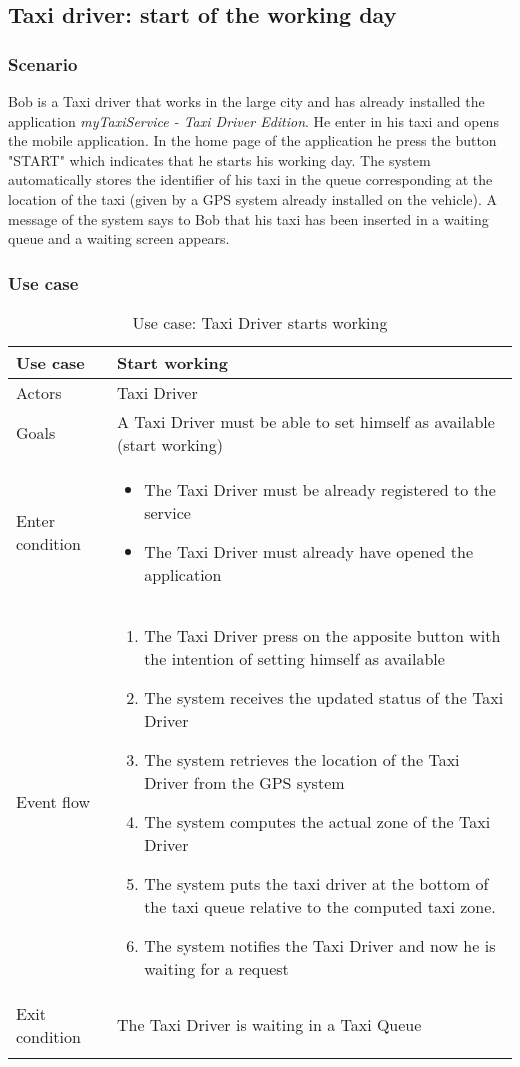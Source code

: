 \pagebreak
\subsection{Taxi driver: start of the working day}
\subsubsection{Scenario}
Bob is a Taxi driver that works in the large city and has already installed the application \textit{myTaxiService - Taxi Driver Edition}.
He enter in his taxi and opens the mobile application. In the home page of the application he press the button "START" which indicates that he starts his working day. The system automatically stores the identifier of his taxi in the queue corresponding at the location of the taxi (given by a GPS system already installed on the vehicle).
A message of the system says to Bob that his taxi has been inserted in a waiting queue and a waiting screen appears.

\subsubsection{Use case}
\begin{center}
\begin{longtable}{| p{} | p{} |} \hline
	Use case & \textbf{Start working} \\ \hline 
	Actors & Taxi Driver \\ \hline
	Goals & A Taxi Driver must be able to set himself as available (start working)  \\ \hline
	Enter condition & \begin{itemize}
						\item The Taxi Driver must be already registered to the service
						\item The Taxi Driver must already have opened the application
						\end{itemize} \\ \hline
	Event flow & \begin{enumerate}
					\item The Taxi Driver press on the apposite button with the intention of setting himself as available
					\item The system receives the updated status of the Taxi Driver
					\item The system retrieves the location of the Taxi Driver from the GPS system
					\item The system computes the actual zone of the Taxi Driver
					\item The system puts the taxi driver at the bottom of the taxi queue relative to the computed taxi zone.
					\item The system notifies the Taxi Driver and now he is waiting for a request
				\end{enumerate} \\ \hline
	Exit condition & The Taxi Driver is waiting in a Taxi Queue\\ \hline
	\caption{Use case: Taxi Driver starts working}
\end{longtable}
\end{center}